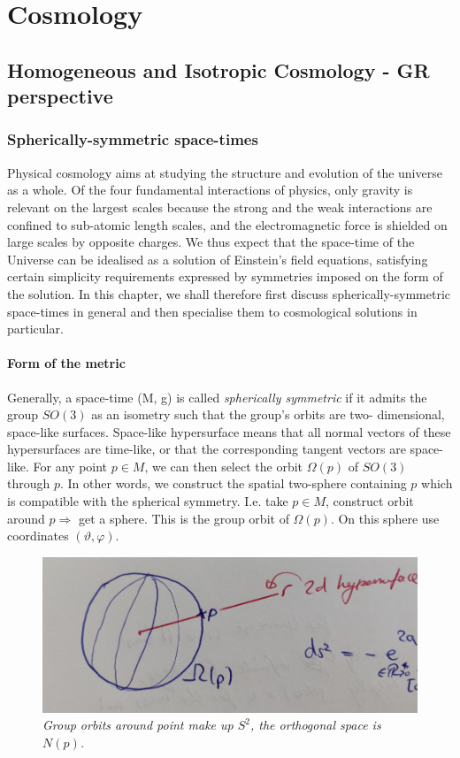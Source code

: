 \chapter{Cosmology}

\section{Homogeneous and Isotropic Cosmology - GR perspective}
\subsection{Spherically-symmetric space-times}
Physical cosmology aims at studying the structure and evolution of the
universe as a whole. Of the four fundamental interactions of physics,
only gravity is relevant on the largest scales because the strong and
the weak interactions are confined to sub-atomic length scales, and the
electromagnetic force is shielded on large scales by opposite charges.
We thus expect that the space-time of the Universe can be idealised as
a solution of Einstein’s field equations, satisfying certain simplicity requirements expressed by symmetries imposed on the form of the solution.
In this chapter, we shall therefore first discuss spherically-symmetric
space-times in general and then specialise them to cosmological solutions
in particular.

\subsubsection{Form of the metric}
Generally, a space-time (M, g) is called \emph{spherically symmetric} if it admits
the group $SO(3)$ as an isometry such that the group’s orbits are two-
dimensional, space-like surfaces. Space-like hypersurface means that all normal vectors of these hypersurfaces are time-like, or that the corresponding tangent vectors are space-like.
For any point $p \in M$, we can then select the orbit $Ω(p)$ of $SO(3)$ through
$p$. In other words, we construct the spatial two-sphere containing $p$
which is compatible with the spherical symmetry. I.e. take $p\in M$, construct orbit around $p\Rightarrow$ get a sphere. This is the group orbit of $\Omega(p)$. On this sphere use coordinates $(\vartheta, \varphi)$.

\begin{figure}[h!]
	\centering
	\includegraphics[width=0.7\linewidth]{gfx/SphericallySymmetricSpacetime}
	\caption{\itshape Group orbits around point make up $S^2$, the orthogonal space is $N(p)$.}
	\label{fig:sphericallysymmetricspacetime}
\end{figure}

